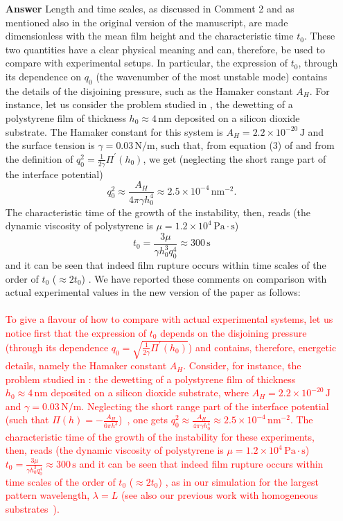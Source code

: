 \documentclass[12pt,english]{article}
\begin{document}
\begin{itemize}
\item[ \textbf{{Answer}}]
{
Length and time scales, as discussed in Comment 2 and as mentioned also in the original version of the manuscript, 
are made dimensionless with the mean film height and the characteristic time $t_0$. 
These two quantities 
have a clear physical meaning and can, therefore, be used to compare with 
experimental setups. In particular, the expression of $t_0$, through its dependence 
on $q_0$ (the wavenumber of the most unstable mode) contains the details 
of the disjoining pressure, such as the Hamaker constant $A_H$. For instance, let us consider the problem studied in \cite{becker2003complex}, the dewetting of a polystyrene film of thickness $h_0 \approx 4 \, \text{nm}$ deposited on a silicon 
dioxide substrate. The Hamaker constant for this system is 
$A_H  = 2.2 \times 10^{-20} \, \text{J}$ and the surface tension is 
$\gamma = 0.03 \, \text{N}/\text{m}$, such that, 
from equation (3) of \cite{becker2003complex} and 
from the definition of $q_0^2 = \frac{1}{2\gamma} \Pi^{\prime}(h_0)$, 
we get (neglecting the short range part of the interface potential)
$$
q_0^2 \approx \frac{A_H}{4\pi \gamma h_0^4} \approx 2.5 \times 10^{-4} \, \text{nm}^{-2}.
$$
The characteristic time of the growth of the instability, then, reads \cite{PhysRevLett.99.114503} (the dynamic viscosity of polystyrene is 
$\mu = 1.2 \times 10^4 \, \text{Pa} \cdot \text{s}$)
$$
t_0 = \frac{3\mu}{\gamma h_0^3 q_0^4} \approx 300 \, \text{s}
$$
and it can be seen that indeed film rupture occurs within time 
scales of the order of $t_0$ ($\approx 2 t_0$) \cite{becker2003complex}.
We have reported these comments on comparison with actual experimental 
values in the new version of the paper as follows:\\
\\
\textcolor{red}{To give a flavour of how to compare with actual experimental systems, let us notice
first that the expression of $t_0$ depends on the disjoining pressure (through its dependence 
 $q_0 = \sqrt{\frac{1}{2\gamma} \Pi^{\prime}(h_0)}$) and contains, therefore, energetic details, namely 
 the Hamaker constant $A_H$. Consider, for instance, the problem studied in \cite{becker2003complex}: the dewetting of a polystyrene film of thickness $h_0 \approx 4 \, \text{nm}$ deposited on a silicon 
dioxide substrate, where $A_H  = 2.2 \times 10^{-20} \, \text{J}$ and 
$\gamma = 0.03 \, \text{N}/\text{m}$. Neglecting the short range part of the interface potential
(such that $\Pi(h)= - \frac{A_H}{6\pi h^3}$)~\cite{Mecke_2005,becker2003complex}, one gets 
$q_0^2 \approx \frac{A_H}{4\pi \gamma h_0^4} \approx 2.5 \times 10^{-4} \, \text{nm}^{-2}$.
The characteristic time of the growth of the instability for these experiments, then, reads \cite{PhysRevLett.99.114503} (the dynamic viscosity of polystyrene is 
$\mu = 1.2 \times 10^4 \, \text{Pa} \cdot \text{s}$) $t_0 = \frac{3\mu}{\gamma h_0^3 q_0^4} \approx 300 \, \text{s}$ and it can be seen that indeed film rupture occurs within time 
scales of the order of $t_0$ ($\approx 2 t_0$) \cite{becker2003complex}, as in our 
simulation for the largest pattern wavelength, $\lambda = L$ (see also our previous work
with homogeneous substrates~\cite{PhysRevE.104.034801}).} 
\\

}
\end{itemize}
\end{document}
